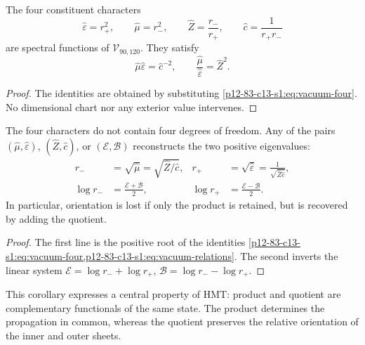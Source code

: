 \begin{theorem}
The four constituent characters
\begin{equation}
\widehat\varepsilon=r_+^2,\qquad
\widehat\mu=r_-^2,\qquad
\widehat Z=\frac{r_-}{r_+},\qquad
\widehat c=\frac1{r_+r_-}
\label{p12-83-c13-s1:eq:vacuum-four}
\end{equation}
are spectral functions of \(\mathcal V_{90,120}\). They satisfy
\begin{equation}
\widehat\mu\widehat\varepsilon=\widehat c^{-2},
\qquad
\frac{\widehat\mu}{\widehat\varepsilon}=\widehat Z^2.
\label{p12-83-c13-s1:eq:vacuum-relations}
\end{equation}
\end{theorem}

\begin{proof}
The identities are obtained by substituting \cref{p12-83-c13-s1:eq:vacuum-four}. No dimensional chart nor any exterior value intervenes.
\end{proof}

\begin{corollary}
The four characters do not contain four degrees of freedom. Any of
the pairs \((\widehat\mu,\widehat\varepsilon)\),
\((\widehat Z,\widehat c)\), or \((\mathcal E,\mathcal B)\) reconstructs the
two positive eigenvalues:
\begin{align}
r_-&=\sqrt{\widehat\mu}
=\sqrt{\widehat Z/\widehat c},
&r_+&=\sqrt{\widehat\varepsilon}
=\frac1{\sqrt{\widehat Z\widehat c}},
\label{p12-83-c13-s1:eq:vacuum-reconstruct-r}\\
\log r_-&=\frac{\mathcal E+\mathcal B}{2},
&\log r_+&=\frac{\mathcal E-\mathcal B}{2}.
\label{p12-83-c13-s1:eq:vacuum-reconstruct-log}
\end{align}
In particular, orientation is lost if only the product is retained,
but is recovered by adding the quotient.
\end{corollary}

\begin{proof}
The first line is the positive root of the identities
\cref{p12-83-c13-s1:eq:vacuum-four,p12-83-c13-s1:eq:vacuum-relations}. The second inverts the linear
system
\(\mathcal E=\log r_-+\log r_+\),
\(\mathcal B=\log r_--\log r_+\).
\end{proof}

This corollary expresses a central property of HMT: product and quotient are
complementary functionals of the same state. The product determines the
propagation in common, whereas the quotient preserves the relative orientation
of the inner and outer sheets.

